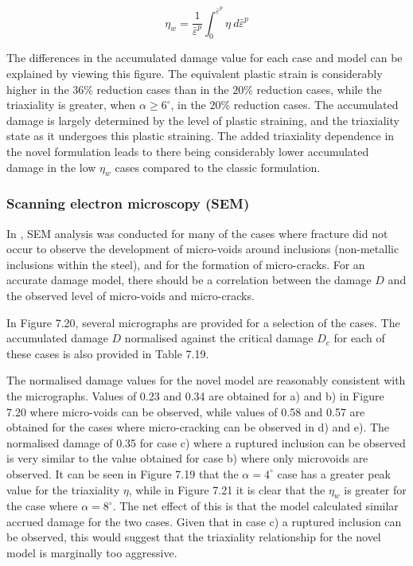 \documentclass[sn-mathphys,Numbered,draft]{sn-jnl}%
\begin{document}
\begin{equation}
\label{eqn:weightedTriax}
\eta_{w}=\frac{1}{\bar{\varepsilon}^p}\int^{\bar{\varepsilon}^p}_{0}\eta\ d \bar{\varepsilon}^p
\end{equation}

The differences in the accumulated damage value for each case and model can be explained by viewing this figure. The equivalent plastic strain is considerably higher in the $36\%$ reduction cases than in the $20\%$ reduction cases, while the triaxiality is greater, when $\alpha\geq6^{\circ}$, in the $20\%$ reduction cases. The accumulated damage is largely determined by the level of plastic straining, and the triaxiality state as it undergoes this plastic straining. The added triaxiality dependence in the novel formulation leads to there being considerably lower accumulated damage in the low $\eta_{w}$ cases compared to the classic formulation. 

\subsubsection{Scanning electron microscopy (SEM)}

In \citet{roh_process_2021}, SEM analysis was conducted for many of the cases where fracture did not occur to observe the development of micro-voids around inclusions (non-metallic inclusions within the steel), and for the formation of micro-cracks. For an accurate damage model, there should be a correlation between the damage $D$ and the observed level of micro-voids and micro-cracks. 

In Figure 7.20, several micrographs are provided for a selection of the cases. The accumulated damage $D$ normalised against the critical damage $D_c$ for each of these cases is also provided in Table 7.19.

The normalised damage values for the novel model are reasonably consistent with the micrographs. Values of 0.23 and 0.34 are obtained  for a) and b) in Figure 7.20 where micro-voids can be observed, while values of 0.58 and 0.57 are obtained for the cases where micro-cracking can be observed in d) and e). The normalised damage of 0.35 for case c) where a ruptured inclusion can be observed is very similar to the value obtained for case b) where only microvoids are observed. It can be seen in Figure 7.19 that the $\alpha=4^{\circ}$ case has a greater peak value for the triaxiality $\eta$, while in Figure 7.21 it is clear that the $\eta_w$ is greater for the case where  $\alpha=8^{\circ}$. The net effect of this is that the model calculated similar accrued damage for the two cases. Given that in case c) a ruptured inclusion can be observed, this would suggest that the triaxiality relationship for the novel model is marginally too aggressive. 
\end{document}
